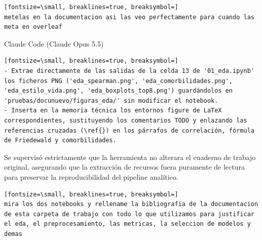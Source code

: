 \documentclass[12pt,a4paper,oneside]{book}
\begin{document}
\begin{iaprompt}
\begin{iaprompt}
\begin{Verbatim}[fontsize=\small, breaklines=true, breaksymbol=]
metelas en la documentacion asi las veo perfectamente para cuando las meta en overleaf
\end{Verbatim}
\end{iaprompt}
\begin{iaresp}{Claude Code (Claude Opus 5.5)}
\begin{Verbatim}[fontsize=\small, breaklines=true, breaksymbol=]
- Extrae directamente de las salidas de la celda 13 de '01_eda.ipynb' los ficheros PNG ('eda_spearman.png', 'eda_comorbilidades.png', 'eda_estilo_vida.png', 'eda_boxplots_top8.png') guardándolos en 'pruebas/docunuevo/figuras_eda/' sin modificar el notebook.
- Inserta en la memoria técnica los entornos figure de LaTeX correspondientes, sustituyendo los comentarios TODO y enlazando las referencias cruzadas (\ref{}) en los párrafos de correlación, fórmula de Friedewald y comorbilidades.
\end{Verbatim}
\end{iaresp}
\begin{iaanalisis}
Se supervisó estrictamente que la herramienta no alterara el cuaderno de trabajo original, asegurando que la extracción de recursos fuera puramente de lectura para preservar la reproducibilidad del pipeline analítico.
\end{iaanalisis}


\begin{iaprompt}
\begin{Verbatim}[fontsize=\small, breaklines=true, breaksymbol=]
mira los dos notebooks y rellename la bibliografia de la documentacion de esta carpeta de trabajo con todo lo que utilizamos para justificar el eda, el preprocesamiento, las metricas, la seleccion de modelos y demas


\end{Verbatim}
\end{iaprompt}
\end{iaprompt}
\end{document}
